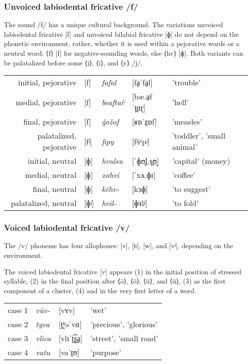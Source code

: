 \subsubsection{Unvoiced labiodental fricative /f/}
The sound /f/ has a unique cultural background. The variations unvoiced labiodental fricative [f] and unvoiced bilabial fricative [ɸ] do not depend on the phonetic environment, rather, whether it is used within a pejorative words or a neutral word: ⟨f⟩ [f] for negative-sounding words, else ⟨hv⟩ [ɸ]. Both variants can be palatalized before some ⟨i⟩, ⟨ī⟩, and ⟨y⟩ /j/.

\begin{tabular}{rllll}
initial, pejorative     & {[}f{]}  & \textit{fafal}   & {[}fa̠ˈfa̠l{]}    & 'trouble'                 \\
medial, pejorative      & {[}f{]}  & \textit{beaftař} & {[}bæ.a̠fˈt̪ɑɽ{]} & 'hell'                    \\
final, pejorative       & {[}f{]}  & \textit{ǧožof}   & {[}ʁɒˈz̠ɒf{]}     & 'measles'                 \\
palatalized, pejorative & {[}fʲ{]} & \textit{fipy}    & {[}fʲiᶻpʲ{]}      & 'toddler', 'small animal' \\
initial, neutral        & {[}ɸ{]}  & \textit{hvulsu}  & {[}ˈɸʊ̟l̠.s̪ʊ̟{]} & 'capital' (money)         \\
medial, neutral         & {[}ɸ{]}  & \textit{xohvi}            & {[}ˈxʌ.ɸɪ{]}      & 'coffee'                  \\
final, neutral          & {[}ɸ{]}  & \textit{këhv-}            & {[}kɜɸ{]}         & 'to suggest'              \\
palatalized, neutral    & {[}ɸʲ{]} & \textit{hvil-}            & {[}ɸʲɪlʲ{]}        & 'to fold'                
\end{tabular}

\subsubsection{Voiced labiodental fricative /v/}
The /v/ phoneme has four allophones: [v], [ʋ], [w], and [vʲ], depending on the environment.

The voiced labiodental fricative [v] appears (1) in the initial position of stressed syllable, (2) in the final position after ⟨ō⟩, ⟨ö⟩, ⟨ū⟩, and ⟨ü⟩, (3) as the first component of a cluster, (4) and in the very first letter of a word.

\begin{tabular}{rlll}
case 1     & \textit{vüv-}    & {[}vʏv{]}    & 'wet'                 \\
case 2     & \textit{tyva}    & {[}t̪ʰəˈvɑ{]} & 'precious', 'glorious'                    \\
case 3     & \textit{vlica}   & {[}vlɪˈt̪͡s̪a̠{]}     & 'street', 'small road'                 \\
case 4     & \textit{vatu}    & {[}vaˈt̠ʊ{]}      & 'purpose' \\
\end{tabular}

